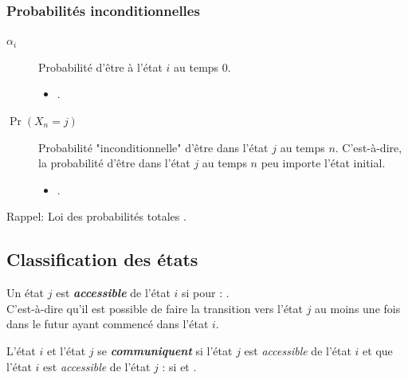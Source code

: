 \documentclass[10pt, french]{article}
\begin{document}
\begin{multicols*}{2}
\subsubsection{Probabilités inconditionnelles}
\begin{distributions}[Notation]
\begin{description}
	\item[$\alpha_{i}$]	Probabilité d'être à l'état $i$ au temps 0.
		\begin{itemize}
		\item	{}.
		\end{itemize}
	\item[$\Pr(X_{n} = j)$]	Probabilité "inconditionnelle" d'être dans l'état $j$ au temps $n$. C'est-à-dire, la probabilité d'être dans l'état $j$ au temps $n$ peu importe l'état initial.
		\begin{itemize}
		\item	{}.
		\end{itemize}
\end{description}
\end{distributions}

\begin{rappel}{Rappel: Loi des probabilités totales}
.
\end{rappel}



\columnbreak
\subsection{Classification des états}
\begin{definitionNOHFILLprop}
Un état $j$ est \textbf{\textit{accessible}} de l'état $i$ si  pour  : .\\

C'est-à-dire qu'il est possible de faire la transition vers l'état $j$ au moins une fois dans le futur ayant commencé dans l'état $i$.
\end{definitionNOHFILLprop}

\begin{definitionNOHFILLprop}
L'état $i$ et l'état $j$ se \textit{\textbf{communiquent}} si l'état $j$ est \textit{accessible} de l'état $i$ et que l'état $i$ est \textit{accessible} de l'état $j$ :  si  et .
\end{definitionNOHFILLprop}


\end{multicols*}
\end{document}
